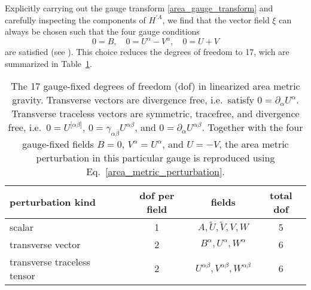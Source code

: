 Explicitly carrying out the gauge transform \eqref{area_gauge_transform} and carefully inspecting the components of $H^{\prime A}$, we find that the vector field $\xi$ can always be chosen such that the four gauge conditions
\begin{equation}
  0 = B,\quad 0 = U^\alpha - V^\alpha,\quad 0 = U + V
\end{equation}
are satisfied (see \cite{Schneider_2017}). This choice reduces the degrees of freedom to 17, wich are summarized in Table~\ref{table_area_dof}.
\begin{table}
  \centering
  \begin{tabular}{l c c c}
    \toprule
    perturbation kind & dof per field & fields & total dof \\
    \midrule
    scalar & 1 & $A,\tilde U,\tilde V,V,W$ & 5 \\
    transverse vector & 2 & $B^\alpha,U^\alpha,W^\alpha$ & 6 \\
    transverse traceless tensor & 2 & $U^{\alpha\beta},V^{\alpha\beta},W^{\alpha\beta}$ & 6 \\
    \bottomrule 
  \end{tabular}
  \caption{The 17 gauge-fixed degrees of freedom (dof) in linearized area metric gravity. Transverse vectors are divergence free, i.e.~satisfy $0 = \partial_\alpha U^\alpha$. Transverse traceless vectors are symmetric, tracefree, and divergence free, i.e.~$0 = U^{\lbrack\alpha\beta\rbrack}$, $0 = \gamma_{\alpha\beta} U^{\alpha\beta}$, and $0 = \partial_\alpha U^{\alpha\beta}$. Together with the four gauge-fixed fields $B=0$, $V^\alpha = U^\alpha$, and $U=-V$, the area metric perturbation in this particular gauge is reproduced using Eq.~\eqref{area_metric_perturbation}.}
  \label{table_area_dof}
\end{table}

